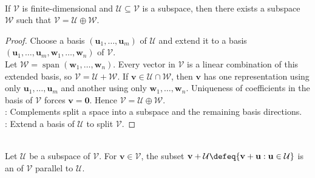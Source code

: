 \begin{proposition} \label{prop:complements-exist-finite-dimensions} \\
If $\mathcal{V}$ is finite-dimensional and $\mathcal{U} \subseteq \mathcal{V}$ is a subspace, then there exists a subspace $\mathcal{W}$ such that $\mathcal{V} = \mathcal{U} \oplus \mathcal{W}$.
\begin{proof}
Choose a basis $(\mathbf{u}_1,\ldots,\mathbf{u}_m)$ of $\mathcal{U}$ and extend it to a basis $(\mathbf{u}_1,\ldots,\mathbf{u}_m,\mathbf{w}_1,\ldots,\mathbf{w}_n)$ of $\mathcal{V}$.\\
Let $\mathcal{W}=\operatorname{span}(\mathbf{w}_1,\ldots,\mathbf{w}_n)$. Every vector in $\mathcal{V}$ is a linear combination of this extended basis, so $\mathcal{V}=\mathcal{U}+\mathcal{W}$. If $\mathbf{v}\in\mathcal{U}\cap\mathcal{W}$, then $\mathbf{v}$ has one representation using only $\mathbf{u}_1,\ldots,\mathbf{u}_m$ and another using only $\mathbf{w}_1,\ldots,\mathbf{w}_n$. Uniqueness of coefficients in the basis of $\mathcal{V}$ forces $\mathbf{v}=\mathbf{0}$. Hence $\mathcal{V}=\mathcal{U}\oplus\mathcal{W}$.\\
: Complements split a space into a subspace and the remaining basis directions.\\
: Extend a basis of $\mathcal{U}$ to split $\mathcal{V}$.
\end{proof}
\end{proposition}

\begin{definition} \\
Let $\mathcal{U}$ be a subspace of $\mathcal{V}$. For $\mathbf{v}\in\mathcal{V}$, the subset $\mathbf{v}+\mathcal{U}\defeq\{\mathbf{v}+\mathbf{u}:\mathbf{u}\in\mathcal{U}\}$ is an  of $\mathcal{V}$ parallel to $\mathcal{U}$.
\end{definition}

